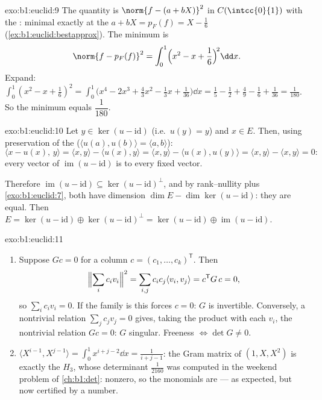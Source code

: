 \begin{solution}{exo:b1:euclid:9}
The quantity is $\norm{f - (a + bX)}^2$ in $C(\intcc{0}{1})$ with
the  : minimal exactly at the  $a + bX = p_F(f) = X - \frac16$
(\cref{ex:b1:euclid:bestapprox}). The minimum is
\[
\norm{f - p_F(f)}^2 = \int_0^1 \Bigl(x^2 - x + \frac16\Bigr)^{\!2}
\dd x .
\]
Expand: $\int_0^1 (x^2 - x + \frac16)^2 = \int_0^1 \bigl(x^4 - 2x^3
+ \frac{4}{3}x^2 - \frac13 x + \frac{1}{36}\bigr)\dd x = \frac15 -
\frac12 + \frac49 - \frac16 + \frac{1}{36} = \frac{1}{180}$.
So the minimum equals $\dfrac{1}{180}$.
\end{solution}

\begin{solution}{exo:b1:euclid:10}
Let $y \in \ker(u - \mathrm{id})$ (i.e.\ $u(y) = y$) and $x \in E$.
Then, using preservation of the  ($\langle u(a),
u(b)\rangle = \langle a, b\rangle$):
\[
\langle x - u(x),\, y\rangle
= \langle x, y\rangle - \langle u(x), y\rangle
= \langle x, y\rangle - \langle u(x), u(y)\rangle
= \langle x, y\rangle - \langle x, y\rangle = 0 :
\]
every vector of $\operatorname{im}(u - \mathrm{id})$ is 
to every fixed vector.

Therefore $\operatorname{im}(u - \mathrm{id}) \subseteq \ker(u -
\mathrm{id})^{\perp}$, and by rank--nullity plus
\cref{exo:b1:euclid:7}, both have dimension $\dim E - \dim\ker(u -
\mathrm{id})$: they are equal. Then $E = \ker(u - \mathrm{id})
\oplus \ker(u - \mathrm{id})^\perp = \ker(u - \mathrm{id}) \oplus
\operatorname{im}(u - \mathrm{id})$.
\end{solution}

\begin{solution}{exo:b1:euclid:11}
\begin{enumerate}
  \item Suppose $Gc = 0$ for a column $c = (c_1, \dots,
        c_k)^{\mathsf T}$. Then
        \[
        \Bigl\lVert\sum_i c_i v_i\Bigr\rVert^2
        = \sum_{i,j} c_i c_j \langle v_i, v_j\rangle
        = c^{\mathsf T} G\, c = 0,
        \]
        so $\sum_i c_i v_i = 0$. If the family is  this
        forces $c = 0$: $G$ is invertible. Conversely, a
        nontrivial relation $\sum_j c_j v_j = 0$ gives, taking
        the product with each $v_i$, the nontrivial relation
        $Gc = 0$: $G$ singular. Freeness $\iff \det G \neq 0$.
  \item $\langle X^{i-1}, X^{j-1}\rangle = \int_0^1 x^{i+j-2}\dd
        x = \frac{1}{i+j-1}$: the Gram matrix of $(1, X, X^2)$
        is exactly the  $H_3$, whose determinant
        $\frac1{2160}$ was computed in the weekend problem of
        \cref{ch:b1:det}: nonzero, so the monomials are  ---
        as expected, but now certified by a number.
\end{enumerate}
\end{solution}

